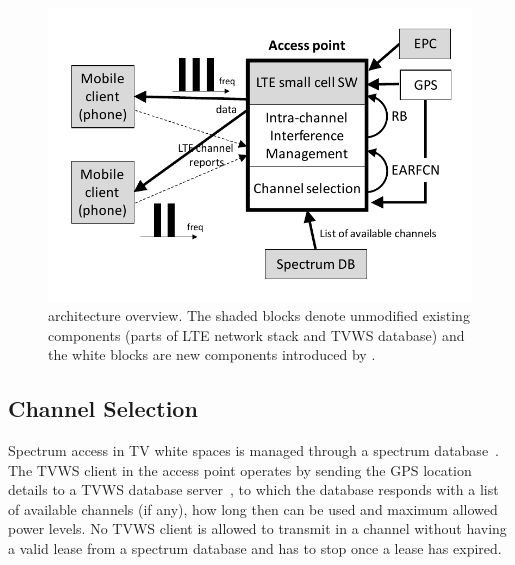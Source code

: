 

\begin{figure}[htb]
\vspace{-15pt}

  \centering
    \includegraphics[width=0.9\columnwidth]{./figs/architecture}
    \vspace{-0.3in}
    \caption{\small{\cf architecture overview. The shaded blocks denote unmodified existing components (parts of LTE network stack and TVWS database) and the white blocks are new components introduced by \cf. }}
  \label{fig:arch}
\vspace{-0.3in}

\end{figure}




\subsection{Channel Selection}

Spectrum access in TV white spaces is managed through a spectrum database~\cite{fcc_db, ofcom_db}. 
The TVWS client in the \cf access point operates by sending the GPS location details to a TVWS database server~\cite{paws},
to which the database responds with a list of available channels (if any), how long then can be used and maximum allowed power levels.  
No TVWS client is allowed to transmit in a channel without having a valid lease from a spectrum database and has to stop once a lease has expired.

